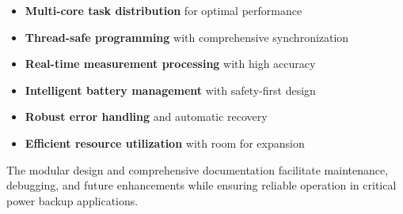 \documentclass[11pt,a4paper]{article}
\begin{document}
\begin{itemize}
    \item \textbf{Multi-core task distribution} for optimal performance
    \item \textbf{Thread-safe programming} with comprehensive synchronization
    \item \textbf{Real-time measurement processing} with high accuracy
    \item \textbf{Intelligent battery management} with safety-first design
    \item \textbf{Robust error handling} and automatic recovery
    \item \textbf{Efficient resource utilization} with room for expansion
\end{itemize}

The modular design and comprehensive documentation facilitate maintenance, debugging, and future enhancements while ensuring reliable operation in critical power backup applications.
\end{document}
